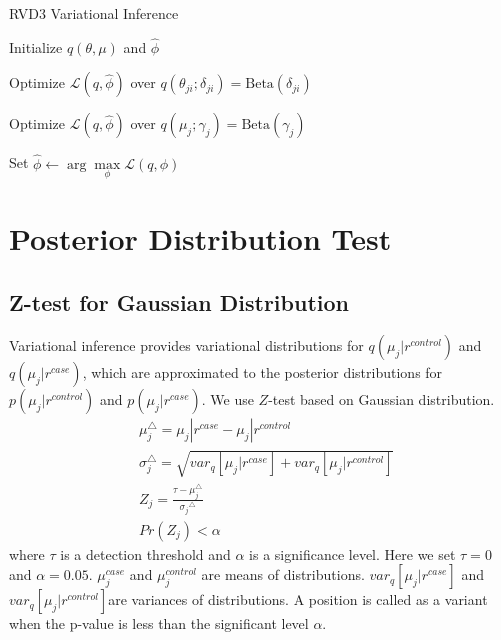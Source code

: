 \documentclass{article}
\begin{document}
\begin{algorithm}[h]
  \caption{RVD3 Variational Inference}

  \begin{algorithmic}[1]

  \State Initialize $ q(\theta, \mu) $ and $\hat{\phi}$

  \Repeat

	\Repeat
	
			\State Optimize $\mathcal{L}(q, \hat{\phi})$ over $q(\theta_{ji}; \delta_{ji}) = \text{Beta} (\delta_{ji})$				
			\EndFor			
		\EndFor
	
			\State Optimize $\mathcal{L}(q, \hat{\phi})$ over $q(\mu_j; \gamma_j) = \text{Beta} (\gamma_j)$			
		\EndFor
	

  \State Set $\hat{\phi} \leftarrow \arg \max\limits_{\phi}
            \mathcal{L}(q,\phi)$

  \end{algorithmic}

\end{algorithm}

\section{Posterior Distribution Test}
\subsection{Z-test for Gaussian Distribution}
Variational inference provides variational distributions for $q(\mu_j|r^{control})$ and $q(\mu_j|r^{case})$, which are approximated to the posterior distributions for $p(\mu_j|r^{control})$ and $p(\mu_j|r^{case})$.
We use $Z$-test based on Gaussian distribution.
\begin{align}
\label{eq:test}
& \mu_j^{\triangle} = \mu_j|r^{case}-\mu_j|r^{control}\\
& \sigma_j^{\triangle} = \sqrt {var_q{[\mu_j|r^{case}]} + var_q{[\mu_j|r^{control}]}}\\
& Z_j = \frac{\tau - \mu_j^{\triangle}}{{\sigma_j}^{\triangle}}\\
& Pr(Z_j) < \alpha
\end{align}
where $\tau$ is a detection threshold and $\alpha$ is a significance level. Here we set $\tau = 0$ and $\alpha = 0.05$.
$\mu_j^{case}$ and $\mu_j^{control}$ are means of distributions.
$var_q{[\mu_j|r^{case}]}$ and  $var_q{[\mu_j|r^{control}]} $are variances of distributions.
A position is called as a variant when the p-value is less than the significant level $\alpha$.
\end{document}
